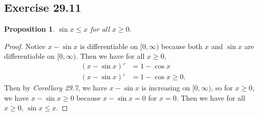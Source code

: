 \documentclass{article}
\newtheorem{proposition}[thm]{Proposition}
\begin{document}
\newpage
\subsection*{Exercise 29.11}
\begin{proposition}
    $\sin x \le x$ for all $x\ge 0$.
\end{proposition}
\begin{proof}
    Notice $x-\sin x$ is differentiable on $[0,\infty)$ because both $x$ and $\sin x$ are
    differentiable on $[0,\infty)$. Then we have for all $x\ge 0$,
    \begin{align*}
        (x-\sin x)' & = 1-\cos x \\
        (x-\sin x)' & = 1-\cos x \ge 0.
    \end{align*}
    Then by \emph{Corollary 29.7}, we have $x-\sin x$ is increasing on $[0,\infty)$, so
    for $x\ge0$, we have $x-\sin x\ge 0$ because $x-\sin x = 0$ for $x=0$. Then we have
    for all $x\ge 0$, $\sin x \le x$.
\end{proof}

\newpage
\end{document}

